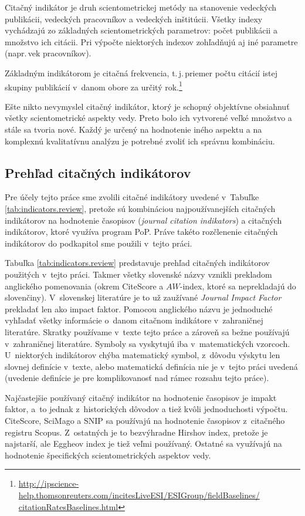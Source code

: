 Citačný indikátor je druh scientometrickej metódy na stanovenie 
vedeckých publikácii, vedeckých pracovníkov a vedeckých inštitúcii.  Všetky
indexy vychádzajú zo základných scientometrických parametrov: počet publikácii a
množstvo ich citácii.  Pri výpočte niektorých indexov zohľadňujú aj iné
parametre (napr.\,vek pracovníkov).

Základným indikátorom je citačná frekvencia, t.\,j.\,priemer počtu citácií istej
skupiny publikácií v~danom obore za určitý
rok.\footnote{\url{http://ipscience-help.thomsonreuters.com/incitesLiveESI/ESIGroup/fieldBaselines/
citationRatesBaselines.html}}

Ešte nikto nevymyslel citačný indikátor, ktorý je schopný objektívne obsiahnuť
všetky scientometrické aspekty vedy. Preto bolo ich vytvorené veľké množstvo a
stále sa tvoria nové. Každý je určený na hodnotenie iného aspektu a na
komplexnú kvalitatívnu analýzu je potrebné zvoliť ich správnu kombináciu.

\subsection{Prehľad citačných indikátorov}

Pre účely tejto práce sme zvolili citačné indikátory uvedené v~Tabuľke
\ref{tab:indicators.review}, pretože sú kombináciou najpoužívanejších citačných
indikátorov na hodnotenie časopisov (\emph{journal citation indikators}) a
citačných indikátorov, ktoré využíva program PoP.
Práve takéto rozčlenenie citačných indikátorov do podkapitol sme použili
v~tejto práci.

Tabuľka \ref{tab:indicators.review} predstavuje prehľad citačných indikátorov
použitých v~tejto práci. Takmer všetky slovenské názvy vznikli prekladom
anglického pomenovania (okrem CiteScore a $AW$-index, ktoré sa neprekladajú do
slovenčiny).  V~slovenskej literatúre je to už zaužívané \emph{Journal Impact
Factor} prekladať len ako impact faktor.  Pomocou anglického názvu je
jednoduché vyhľadať všetky informácie o~danom citačnom indikátore v~zahraničnej
literatúre. Skratky používame v~texte tejto práce a zároveň sa bežne používajú
v~zahraničnej literatúre. Symboly sa vyskytujú iba v~matematických vzorcoch.
U~niektorých indikátorov chýba matematický symbol, z~dôvodu výskytu len slovnej
definície v~texte, alebo matematická definícia nie je v~tejto práci uvedená
(uvedenie definície je pre komplikovanosť nad rámec rozsahu tejto práce).

Najčastejšie používaný citačný indikátor na hodnotenie časopisov je impakt faktor, a~to
jednak z~historických dôvodov a tiež kvôli jednoduchosti výpočtu. CiteScore, SciMago a
SNIP sa používajú na hodnotenie časopisov z~citačného registru Scopus.
Z~ostatných je to bezvýhradne Hirshov index, pretože je najstarší, ale Eggheov
index je tiež veľmi používaný.  Ostatné sa využívajú na hodnotenie špecifických
scientometrických aspektov vedy.

